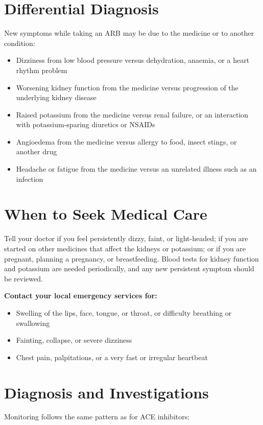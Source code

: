 \section*{Differential Diagnosis}
New symptoms while taking an ARB may be due to the medicine or to another condition:

\begin{itemize}
    \item Dizziness from low blood pressure versus dehydration, anaemia, or a heart rhythm problem
    \item Worsening kidney function from the medicine versus progression of the underlying kidney disease
    \item Raised potassium from the medicine versus renal failure, or an interaction with potassium-sparing diuretics or NSAIDs
    \item Angioedema from the medicine versus allergy to food, insect stings, or another drug
    \item Headache or fatigue from the medicine versus an unrelated illness such as an infection
\end{itemize}

\section*{When to Seek Medical Care}
Tell your doctor if you feel persistently dizzy, faint, or light-headed; if you are started on other medicines that affect the kidneys or potassium; or if you are pregnant, planning a pregnancy, or breastfeeding. Blood tests for kidney function and potassium are needed periodically, and any new persistent symptom should be reviewed.

\textbf{Contact your local emergency services for:}
\begin{itemize}
    \item Swelling of the lips, face, tongue, or throat, or difficulty breathing or swallowing
    \item Fainting, collapse, or severe dizziness
    \item Chest pain, palpitations, or a very fast or irregular heartbeat
\end{itemize}

\section*{Diagnosis and Investigations}
Monitoring follows the same pattern as for ACE inhibitors:

